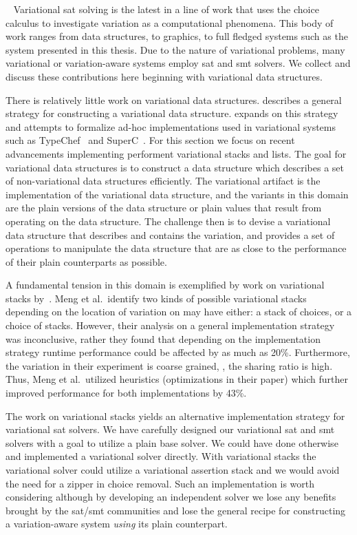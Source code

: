 ~\label{section:related-work:variational-systems}
%
Variational \ac{sat} solving is the latest in a line of work that uses the
choice calculus to investigate variation as a computational phenomena. This body
of work ranges from data structures, to graphics, to full fledged systems such
as the system presented in this thesis. Due to the nature of variational
problems, many variational or variation-aware systems employ \ac{sat} and
\ac{smt} solvers. We collect and discuss these contributions here beginning with
variational data structures.

There is relatively little work on variational data structures.
\citet{EWC13fosd} describes a general strategy for constructing a variational
data structure. \citet{Walk14onward} expands on this strategy and attempts to
formalize ad-hoc implementations used in variational systems such as
TypeChef~\cite{KKHL:FOSD10} and SuperC~\cite{GG:PLDI12}. For this section we
focus on recent advancements implementing performent variational stacks and
lists. The goal for variational data structures is to construct a data structure
which describes a set of non-variational data structures efficiently. The
variational artifact is the implementation of the variational data structure,
and the variants in this domain are the plain versions of the data structure or
plain values that result from operating on the data structure. The challenge
then is to devise a variational data structure that describes and contains the
variation, and provides a set of operations to manipulate the data structure
that are as close to the performance of their plain counterparts as possible.

A fundamental tension in this domain is exemplified by work on variational
stacks by~\citet{MMWWK17vamos}. Meng et al.\ identify two kinds of possible
variational stacks depending on the location of variation on may have either: a
stack of choices, or a choice of stacks. However, their analysis on a general
implementation strategy was inconclusive, rather they found that depending on
the implementation strategy runtime performance could be affected by as much as
20\%. Furthermore, the variation in their experiment is coarse grained, \ie{},
the sharing ratio is high. Thus, Meng et al.\ utilized heuristics (optimizations
in their paper) which further improved performance for both implementations by
43\%.

The work on variational stacks yields an alternative implementation strategy for
variational \ac{sat} solvers. We have carefully designed our variational
\ac{sat} and \ac{smt} solvers with a goal to utilize a plain base solver. We
could have done otherwise and implemented a variational solver directly. With
variational stacks the variational solver could utilize a variational assertion
stack and we would avoid the need for a zipper in choice removal. Such an
implementation is worth considering although by developing an independent solver
we lose any benefits brought by the \ac{sat}/\ac{smt} communities and lose the
general recipe for constructing a variation-aware system \emph{using} its plain
counterpart.

